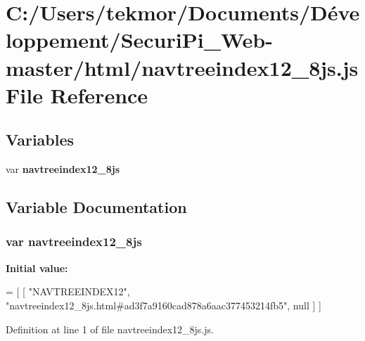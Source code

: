 \section{C\+:/\+Users/tekmor/\+Documents/\+Développement/\+Securi\+Pi\+\_\+\+Web-\/master/html/navtreeindex12\+\_\+8js.js File Reference}
\label{navtreeindex12__8js_8js}
\subsection*{Variables}
\begin{DoxyCompactItemize}
\item 
var {\bf navtreeindex12\+\_\+8js}
\end{DoxyCompactItemize}


\subsection{Variable Documentation}
\subsubsection[{navtreeindex12\+\_\+8js}]{\setlength{\rightskip}{0pt plus 5cm}var navtreeindex12\+\_\+8js}\label{navtreeindex12__8js_8js_aaa5766a87cae5d17e56e51cab799175a}
{\bfseries Initial value\+:}
\begin{DoxyCode}
=
[
    [ \textcolor{stringliteral}{"NAVTREEINDEX12"}, \textcolor{stringliteral}{"navtreeindex12\_8js.html#ad3f7a9160cad878a6aac377453214fb5"}, null ]
]
\end{DoxyCode}


Definition at line 1 of file navtreeindex12\+\_\+8js.\+js.

